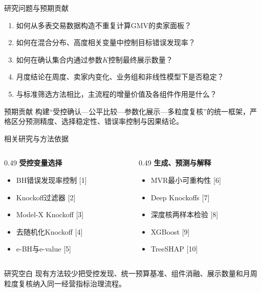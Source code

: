\documentclass[aspectratio=169]{beamer}
\begin{document}
\begin{frame}{研究问题与预期贡献}
  \begin{enumerate}
    \item 如何从多表交易数据构造不重复计算GMV的卖家面板？
    \item 如何在混合分布、高度相关变量中控制目标错误发现率？
    \item 如何在确认集合内通过参数$K$控制最终展示数量？
    \item 月度结论在周度、卖家内变化、业务组和非线性模型下是否稳定？
    \item 与标准筛选方法相比，主流程的增量价值及各组件作用是什么？
  \end{enumerate}
  \vspace{0.3cm}
  \begin{block}{预期贡献}
    构建“受控确认—公平比较—参数化展示—多粒度复核”的统一框架，严格区分预测精度、选择稳定性、错误率控制与因果结论。
  \end{block}
\end{frame}

\begin{frame}{相关研究与方法依据}
  \begin{columns}[T]
    \begin{column}{0.49\textwidth}
      \textbf{受控变量选择}
      \begin{itemize}
        \item BH错误发现率控制 [1]
        \item Knockoff过滤器 [2]
        \item Model-X Knockoff [3]
        \item 去随机化Knockoff [4]
        \item e-BH与e-value [5]
      \end{itemize}
    \end{column}
    \begin{column}{0.49\textwidth}
      \textbf{生成、预测与解释}
      \begin{itemize}
        \item MVR最小可重构性 [6]
        \item Deep Knockoffs [7]
        \item 深度核两样本检验 [8]
        \item XGBoost [9]
        \item TreeSHAP [10]
      \end{itemize}
    \end{column}
  \end{columns}
  \begin{alertblock}{研究空白}
    现有方法较少把受控发现、统一预算基准、组件消融、展示数量和月周粒度复核纳入同一经营指标治理流程。
  \end{alertblock}
\end{frame}
\end{document}
